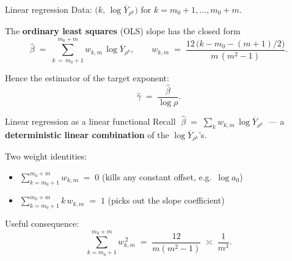 \documentclass[10pt, aspectratio=169, xcolor={table}]{beamer}
\newcommand{\Var}{\operatorname{Var}}
\newcommand{\TODO}[1]{{\color{red}\textbf{[TODO]} #1}}
\renewcommand{\TODO}[1]{}
\begin{document}
\begin{frame}{Linear regression}
  Data: $\big(k,\, \log \overline Y_{\rho^k}\big)$ for
  $k = m_0 + 1, \ldots, m_0 + m$.

  \vspace{0.4em}
  The \textbf{ordinary least squares} (OLS) slope has the closed form
  \[
    \hat\beta \;=\; \sum_{k\, =\, m_0 + 1}^{m_0 + m}
        w_{k,m}\, \log \overline Y_{\rho^k},
    \qquad
    w_{k,m} \;=\; \dfrac{12\,\big(k - m_0 - (m+1)/2\big)}{m\,(m^2 - 1)}.
  \]

  Hence the estimator of the target exponent:
  \[
    \hat\gamma \;=\; \dfrac{\hat\beta}{\log \rho}.
  \]

  \TODO{The weights $w_{k,m}$ are exactly the closed-form OLS
        coefficients for fitting a line to equally-spaced abscissas
        $k$. They are linear in $k$, symmetric about the midpoint
        $m_0 + (m+1)/2$, and have two key identities (next slide).
        Two free knobs in the estimator:
        $m_0$ --- how many small-$r$ scales to drop (bias control),
        and $m$ --- window width (variance control). Both are tuned
        in Section 6.}
\end{frame}

\begin{frame}{Linear regression as a linear functional}
  Recall $\;\hat\beta \;=\; \displaystyle\sum_{k} w_{k,m}\,
        \log \overline Y_{\rho^k}\;$ --- a
  \textbf{deterministic linear combination} of the
  $\log \overline Y_{\rho^k}$'s.

  \vspace{0.4em}
  Two weight identities:
  \begin{itemize}
    \item $\displaystyle \sum_{k = m_0 + 1}^{m_0 + m} w_{k,m}
              \;=\; 0$
          \quad (kills any constant offset, e.g.\ $\log a_0$)
    \item $\displaystyle \sum_{k = m_0 + 1}^{m_0 + m} k\, w_{k,m}
              \;=\; 1$
          \quad (picks out the slope coefficient)
  \end{itemize}

  \vspace{0.4em}
  Useful consequence:
  \[
    \sum_{k = m_0 + 1}^{m_0 + m} w_{k,m}^{\,2}
    \;=\;
    \frac{12}{m(m^2-1)}
      \;\asymp\; \dfrac{1}{m^{3}}.
  \]

  \TODO{Linear functionals of random variables commute with the
        CLT, so once we know each summand obeys a CLT we get a CLT
        for $\hat\beta$ for free. The identity
        $\sum w_{k,m}^2 \asymp 1/m^3$ is where the $\sqrt{nm^3}$
        rate of the main theorem comes from:
        $\Var \hat\beta \approx \Var(\log \overline Y) \cdot
        \sum w^2 \asymp (1/n) \cdot (1/m^3)$, so the standard
        error is $\asymp 1/\sqrt{nm^3}$.}
\end{frame}
\end{document}

